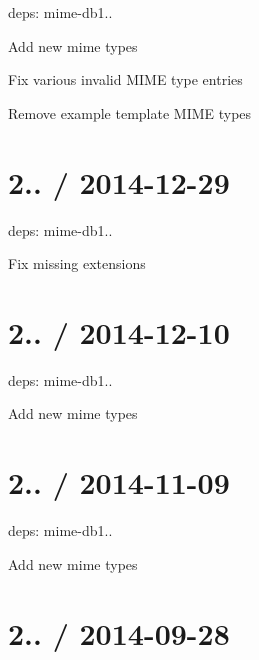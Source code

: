 \begin{DoxyItemize}
\item deps\+: mime-\/db1..
\begin{DoxyItemize}
\item Add new mime types
\item Fix various invalid M\+I\+M\+E type entries
\item Remove example template M\+I\+M\+E types
\end{DoxyItemize}
\end{DoxyItemize}

\section*{2.. / 2014-\/12-\/29 }


\begin{DoxyItemize}
\item deps\+: mime-\/db1..
\begin{DoxyItemize}
\item Fix missing extensions
\end{DoxyItemize}
\end{DoxyItemize}

\section*{2.. / 2014-\/12-\/10 }


\begin{DoxyItemize}
\item deps\+: mime-\/db1..
\begin{DoxyItemize}
\item Add new mime types
\end{DoxyItemize}
\end{DoxyItemize}

\section*{2.. / 2014-\/11-\/09 }


\begin{DoxyItemize}
\item deps\+: mime-\/db1..
\begin{DoxyItemize}
\item Add new mime types
\end{DoxyItemize}
\end{DoxyItemize}

\section*{2.. / 2014-\/09-\/28 }


